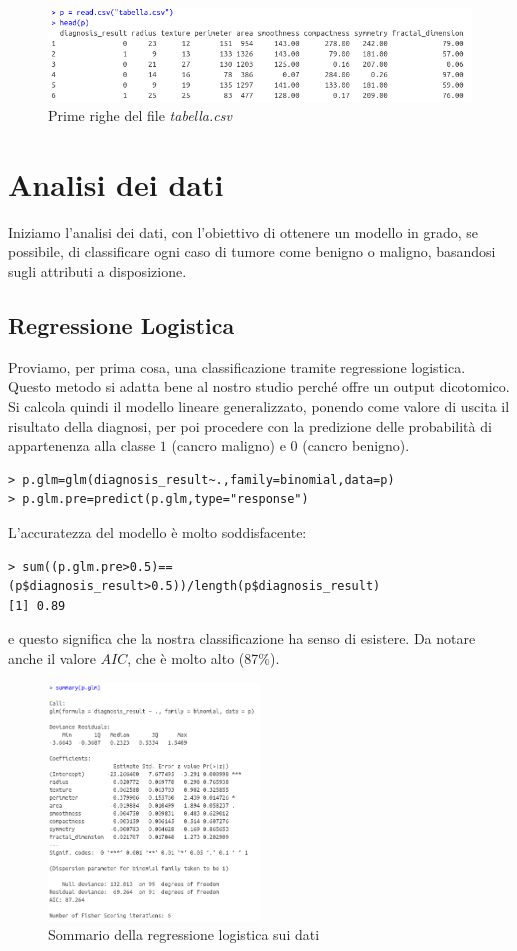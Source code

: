 \documentclass[11pt,a4paper,oneside]{article}
\begin{document}
\begin{figure}[h]
\centering
\includegraphics[width=1\textwidth]{images/head}
\caption{Prime righe del file \textit{tabella.csv}}
\label{fig:head}
\end{figure}

\section{Analisi dei dati}
Iniziamo l'analisi dei dati, con l'obiettivo di ottenere un modello in grado, se possibile, di classificare ogni caso di tumore come benigno o maligno, basandosi sugli attributi a disposizione.
\subsection{Regressione Logistica}
Proviamo, per prima cosa, una classificazione tramite regressione logistica. Questo metodo si adatta bene al nostro studio perché offre un output dicotomico. Si calcola quindi il modello lineare generalizzato, ponendo come valore di uscita il risultato della diagnosi, per poi procedere con la predizione delle probabilità di appartenenza alla classe $1$ (cancro maligno) e $0$ (cancro benigno).
\begin{verbatim}
> p.glm=glm(diagnosis_result~.,family=binomial,data=p)
> p.glm.pre=predict(p.glm,type="response")
\end{verbatim}
L'accuratezza del modello è molto soddisfacente:
\begin{verbatim}
> sum((p.glm.pre>0.5)==(p$diagnosis_result>0.5))/length(p$diagnosis_result)
[1] 0.89
\end{verbatim}
e questo significa che la nostra classificazione ha senso di esistere. Da notare anche il valore $AIC$, che è molto alto (87\%).
\begin{figure}[h]
\centering
\includegraphics[width=0.5\textwidth]{images/glm}
\caption{Sommario della regressione logistica sui dati}
\label{fig:glm}
\end{figure}
\end{document}
